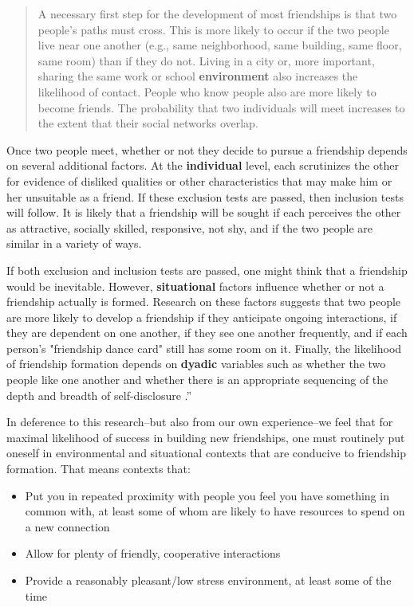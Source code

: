 \documentclass[12pt,letterpaper]{book}
\begin{document}
\begin{quotation}
	A necessary first step for the development of most friendships is that two people's paths must cross. This is more likely to occur if the two people live near one another (e.g., same neighborhood, same building, same floor, same room) than if they do not. Living in a city or, more important, sharing the same work or school \textbf{environment} also increases the likelihood of contact. People who know people also are more likely to become friends. The probability that two individuals will meet increases to the extent that their social networks overlap.
\end{quotation}

Once two people meet, whether or not they decide to pursue a friendship depends on several additional factors. At the \textbf{individual} level, each scrutinizes the other for evidence of disliked qualities or other characteristics that may make him or her unsuitable as a friend. If these exclusion tests are passed, then inclusion tests will follow. It is likely that a friendship will be sought if each perceives the other as attractive, socially skilled, responsive, not shy, and if the two people are similar in a variety of ways.

If both exclusion and inclusion tests are passed, one might think that a friendship would be inevitable. However, \textbf{situational} factors influence whether or not a friendship actually is formed. Research on these factors suggests that two people are more likely to develop a friendship if they anticipate ongoing interactions, if they are dependent on one another, if they see one another frequently, and if each person's "friendship dance card" still has some room on it. Finally, the likelihood of friendship formation depends on \textbf{dyadic} variables such as whether the two people like one another and whether there is an appropriate sequencing of the depth and breadth of self-disclosure \cite[p. 68]{fehr2008friendship}.”

In deference to this research–but also from our own experience–we feel that for maximal likelihood of success in building new friendships, one must routinely put oneself in environmental and situational contexts that are conducive to friendship formation. That means contexts that:
\begin{itemize}
	\item Put you in repeated proximity with people you feel you have something in common with, at least some of whom are likely to have resources to spend on a new connection
	\item Allow for plenty of friendly, cooperative interactions 
	\item Provide a reasonably pleasant/low stress environment, at least some of the time
\end{itemize}
\end{document}
